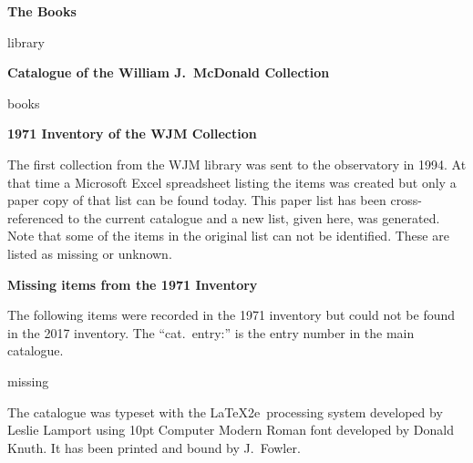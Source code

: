 \documentclass[letterpaper]{book}
\begin{document}
\vspace*{1 in}
\centerline{\Large \bf The Books}
\bigskip\bigskip
{library}
\newpage

\printbibliography

\mainmatter
\begin{center}
  {\Large \bf Catalogue of the William J.\ McDonald Collection}
\end{center}
\bigskip
{books}
\cleardoublepage

\begin{center}
  {\Large \bfseries 1971 Inventory of the WJM Collection}
\end{center}
The first collection from the WJM library was sent to the observatory
in 1994. At that time a Microsoft Excel spreadsheet listing the items
was created but only a paper copy of that list can be found today.
This paper list has been cross-referenced to the current catalogue and
a new list, given here, was generated. Note that some of the items in
the original list can not be identified. These are listed as missing or
unknown.
\bigskip




\backmatter

\begin{center}
  {\Large \bfseries Missing items from the 1971 Inventory}
\end{center}

The following items were recorded in the 1971 inventory but could not be
found in the 2017 inventory. The ``cat.~entry:'' is the entry number in the
main catalogue.

{missing}

\printindex[author]
\cleardoublepage

\begin{colophon}
  The catalogue was typeset with the \LaTeX2e\ processing system
  developed by Leslie Lamport using 10pt Computer Modern Roman font
  developed by Donald Knuth. It has been printed and bound by
  J.~Fowler.
\end{colophon}
\end{document}
